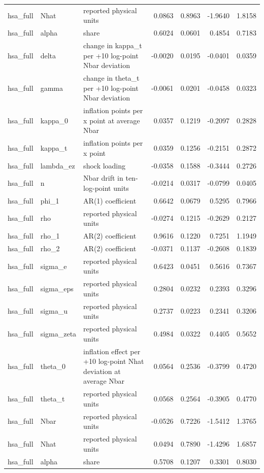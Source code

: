 \begin{tabular}{lllrrrr}
hsa\_full & Nhat & reported physical units & 0.0863 & 0.8963 & -1.9640 & 1.8158 \\
hsa\_full & alpha & share & 0.6024 & 0.0601 & 0.4854 & 0.7183 \\
hsa\_full & delta & change in kappa\_t per +10 log-point Nbar deviation & -0.0020 & 0.0195 & -0.0401 & 0.0359 \\
hsa\_full & gamma & change in theta\_t per +10 log-point Nbar deviation & -0.0061 & 0.0201 & -0.0458 & 0.0323 \\
hsa\_full & kappa\_0 & inflation points per x point at average Nbar & 0.0357 & 0.1219 & -0.2097 & 0.2828 \\
hsa\_full & kappa\_t & inflation points per x point & 0.0359 & 0.1256 & -0.2151 & 0.2872 \\
hsa\_full & lambda\_ez & shock loading & -0.0358 & 0.1588 & -0.3444 & 0.2726 \\
hsa\_full & n & Nbar drift in ten-log-point units & -0.0214 & 0.0317 & -0.0799 & 0.0405 \\
hsa\_full & phi\_1 & AR(1) coefficient & 0.6642 & 0.0679 & 0.5295 & 0.7966 \\
hsa\_full & rho & reported physical units & -0.0274 & 0.1215 & -0.2629 & 0.2127 \\
hsa\_full & rho\_1 & AR(2) coefficient & 0.9616 & 0.1220 & 0.7251 & 1.1949 \\
hsa\_full & rho\_2 & AR(2) coefficient & -0.0371 & 0.1137 & -0.2608 & 0.1839 \\
hsa\_full & sigma\_e & reported physical units & 0.6423 & 0.0451 & 0.5616 & 0.7367 \\
hsa\_full & sigma\_eps & reported physical units & 0.2804 & 0.0232 & 0.2393 & 0.3296 \\
hsa\_full & sigma\_u & reported physical units & 0.2737 & 0.0223 & 0.2341 & 0.3206 \\
hsa\_full & sigma\_zeta & reported physical units & 0.4984 & 0.0322 & 0.4405 & 0.5652 \\
hsa\_full & theta\_0 & inflation effect per +10 log-point Nhat deviation at average Nbar & 0.0564 & 0.2536 & -0.3799 & 0.4720 \\
hsa\_full & theta\_t & reported physical units & 0.0568 & 0.2564 & -0.3905 & 0.4770 \\
hsa\_full & Nbar & reported physical units & -0.0526 & 0.7226 & -1.5412 & 1.3765 \\
hsa\_full & Nhat & reported physical units & 0.0494 & 0.7890 & -1.4296 & 1.6857 \\
hsa\_full & alpha & share & 0.5708 & 0.1207 & 0.3301 & 0.8030 \\

\end{tabular}
